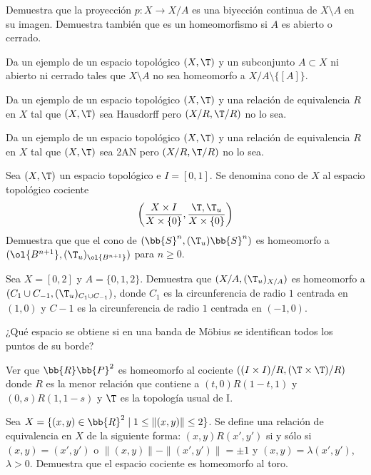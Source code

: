 \begin{ejercicio}
    Demuestra que la proyección $p : X \to X/A$ es una biyección continua de $X \setminus A$ en su imagen. Demuestra también que es un homeomorfismo si $A$ es abierto o cerrado.
\end{ejercicio}

\begin{ejercicio}
    Da un ejemplo de un espacio topológico $(X,\T)$ y un subconjunto $A \subset X$ ni abierto ni cerrado tales que $X \setminus A$ no sea homeomorfo a $X/A \setminus \{[A]\}$.
\end{ejercicio}

\begin{ejercicio}
    Da un ejemplo de un espacio topológico $(X,\T)$ y una relación de equivalencia $R$ en $X$ tal que $(X,\T)$ sea Hausdorff pero $(X/R, \T/R)$ no lo sea.
\end{ejercicio}

\begin{ejercicio}
    Da un ejemplo de un espacio topológico $(X,\T)$ y una relación de equivalencia $R$ en $X$ tal que $(X,\T)$ sea 2AN pero $(X/R, \T /R)$ no lo sea.
\end{ejercicio}

\begin{ejercicio}
    Sea $(X,\T)$ un espacio topológico e $I = [0, 1]$. Se denomina cono de $X$ al espacio topológico cociente
    \begin{equation*}
        \left(\frac{X\times I}{X\times \{0\}},\frac{\T,\T_u}{X\times \{0\}}\right)
    \end{equation*}
    Demuestra que que el cono de $(\bb{S}^n,(\T_u)\bb{S}^n)$ es homeomorfo a $(\ol{B^{n+1}},(\T_u)_{\ol{B^{n+1}}})$ para $n \geq 0$.
\end{ejercicio}

\begin{ejercicio}
    Sea $X = [0, 2]$ y $A = \{0, 1, 2\}$. Demuestra que $(X/A,(\T_u)_{X/A})$ es homeomorfo a $(C_1 \cup C_{-1},(\T_u)_{C_1 \cup C_{-1}})$, donde $C_1$ es la circunferencia de radio $1$ centrada en $(1, 0)$ y $C-1$ es la circunferencia de radio $1$ centrada en $(-1, 0)$.
\end{ejercicio}

\begin{ejercicio}
    ¿Qué espacio se obtiene si en una banda de Möbius se identifican todos los puntos de su borde?
\end{ejercicio}

\begin{ejercicio}
    Ver que $\bb{R}\bb{P}^2$ es homeomorfo al cociente $((I \times I)/R,(\T \times \T )/R)$ donde $R$ es la menor relación que contiene a $(t, 0)R(1 - t, 1)$ y $(0, s)R(1, 1 - s)$ y $\T$ es la topología usual de I.
\end{ejercicio}

\begin{ejercicio}
    Sea $X = \{(x, y) \in \bb{R}^2\mid 1 \leq \|(x, y)\| \leq 2\}$. Se define una relación de equivalencia en $X$ de la siguiente forma: $(x, y)R(x', y')$ si y sólo si $(x, y) = (x', y')$ o $\|(x, y)\| - \|(x', y')\| = \pm 1$ y $(x, y) = \lambda(x', y')$, $\lambda > 0$. Demuestra que el espacio cociente es homeomorfo al toro.
\end{ejercicio}